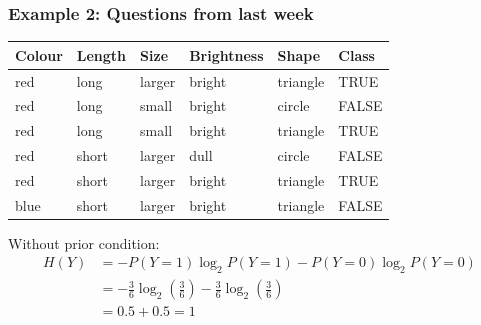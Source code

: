 \documentclass[aspectratio=169, 10pt]{beamer}
\begin{document}
\begin{frame}
    \frametitle{Example 2: Questions from last week}
    \small

    \begin{table}[]
        \begin{tabular}{lllll|l}
        Colour & Length & Size & Brightness & Shape & Class \\ \hline
        red & long & larger & bright & triangle & TRUE \\
        red & long & small & bright & circle & FALSE \\
        red & long & small & bright & triangle & TRUE \\
        red & short & larger & dull & circle & FALSE \\
        red & short & larger & bright & triangle & TRUE \\
        blue & short & larger & bright & triangle & FALSE
        \end{tabular}
    \end{table}

    Without prior condition:
    \[
        \begin{split}
            H(Y) & = -P(Y=1) \log_2 P(Y=1) -P(Y=0) \log_2 P(Y=0) \\
                & = -\frac{3}{6} \log_2(\frac{3}{6}) -\frac{3}{6} \log_2(\frac{3}{6}) \\
                & = 0.5 + 0.5 = 1
        \end{split}
    \]

\end{frame}
\end{document}
